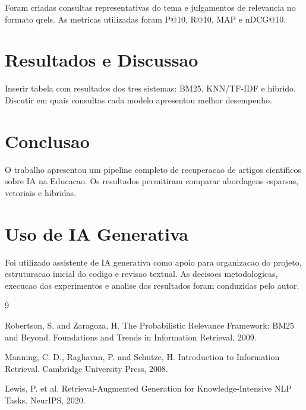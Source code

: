 \documentclass[12pt]{article}
\begin{document}
Foram criadas consultas representativas do tema e julgamentos de relevancia no formato qrels. As metricas utilizadas foram P@10, R@10, MAP e nDCG@10.

\section{Resultados e Discussao}

Inserir tabela com resultados dos tres sistemas: BM25, KNN/TF-IDF e hibrido. Discutir em quais consultas cada modelo apresentou melhor desempenho.

\section{Conclusao}

O trabalho apresentou um pipeline completo de recuperacao de artigos cientificos sobre IA na Educacao. Os resultados permitiram comparar abordagens esparsas, vetoriais e hibridas.

\section{Uso de IA Generativa}

Foi utilizado assistente de IA generativa como apoio para organizacao do projeto, estruturacao inicial do codigo e revisao textual. As decisoes metodologicas, execucao dos experimentos e analise dos resultados foram conduzidas pelo autor.


\begin{thebibliography}{9}

Robertson, S. and Zaragoza, H. The Probabilistic Relevance Framework: BM25 and Beyond. Foundations and Trends in Information Retrieval, 2009.

Manning, C. D., Raghavan, P. and Schutze, H. Introduction to Information Retrieval. Cambridge University Press, 2008.

Lewis, P. et al. Retrieval-Augmented Generation for Knowledge-Intensive NLP Tasks. NeurIPS, 2020.

\end{thebibliography}
\end{document}
